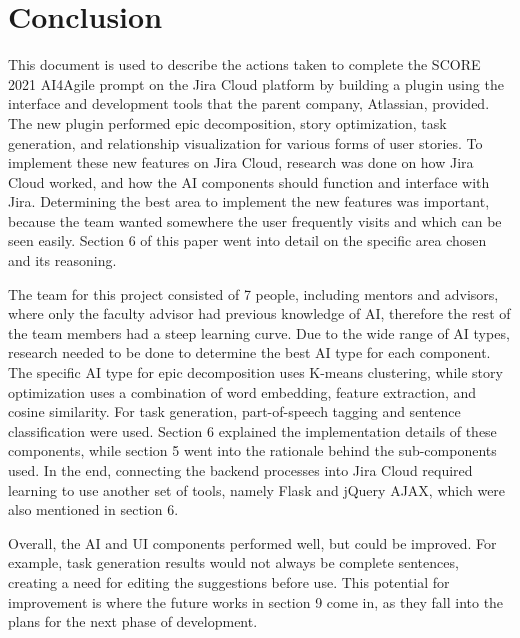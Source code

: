 \section{Conclusion}
This document is used to describe the actions taken to complete the SCORE 2021 AI4Agile prompt on the Jira Cloud platform by building a plugin using the interface and development tools that the parent company, Atlassian, provided. The new plugin performed epic decomposition, story optimization, task generation, and relationship visualization for various forms of user stories. To implement these new features on Jira Cloud, research was done on how Jira Cloud worked, and how the AI components should function and interface with Jira. Determining the best area to implement the new features was important, because the team wanted somewhere the user frequently visits and which can be seen easily. Section 6 of this paper went into detail on the specific area chosen and its reasoning. 

The team for this project consisted of 7 people, including mentors and advisors, where only the faculty advisor had previous knowledge of AI, therefore the rest of the team members had a steep learning curve. Due to the wide range of AI types, research needed to be done to determine the best AI type for each component. The specific AI type for epic decomposition uses K-means clustering, while story optimization uses a combination of word embedding, feature extraction, and cosine similarity. For task generation, part-of-speech tagging and sentence classification were used. Section 6 explained the implementation details of these components, while section 5 went into the rationale behind the sub-components used. In the end, connecting the backend processes into Jira Cloud required learning to use another set of tools, namely Flask and jQuery AJAX, which were also mentioned in section 6. 

Overall, the AI and UI components performed well, but could be improved. For example, task generation results would not always be complete sentences, creating a need for editing the suggestions before use. This potential for improvement is where the future works in section 9 come in, as they fall into the plans for the next phase of development.